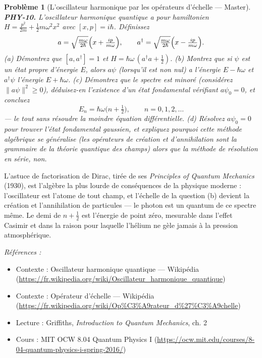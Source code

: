\documentclass[11pt]{article}
\newtheorem{problem}{Problème}
\newenvironment{refs}{\par\small\noindent\emph{Références :}\begin{itemize}\setlength\itemsep{0pt}}{\end{itemize}\normalsize}
\begin{document}
\begin{problem}[{L'oscillateur harmonique par les opérateurs d'échelle --- Master}]
\textbf{PHY-10.} L'oscillateur harmonique quantique a pour hamiltonien
$H = \frac{p^2}{2m} + \frac12 m\omega^2 x^2$ avec $[x, p] = i\hbar$. Définissez
\[ a = \sqrt{\tfrac{m\omega}{2\hbar}}\Bigl(x + \tfrac{ip}{m\omega}\Bigr), \qquad
a^\dagger = \sqrt{\tfrac{m\omega}{2\hbar}}\Bigl(x - \tfrac{ip}{m\omega}\Bigr). \]
(a) Démontrez que $[a, a^\dagger] = 1$ et $H = \hbar\omega\,(a^\dagger a + \tfrac12)$.
(b) Montrez que si $\psi$ est un état propre d'énergie $E$, alors $a\psi$ (lorsqu'il est non
nul) a l'énergie $E - \hbar\omega$ et $a^\dagger\psi$ l'énergie $E + \hbar\omega$.
(c) Démontrez que le spectre est minoré (considérez $\lVert a\psi \rVert^2 \ge 0$),
déduisez-en l'existence d'un état fondamental vérifiant $a\psi_0 = 0$, et concluez
\[ E_n = \hbar\omega\bigl(n + \tfrac12\bigr), \qquad n = 0, 1, 2, \dots \]
--- le tout sans résoudre la moindre équation différentielle. (d) Résolvez $a\psi_0 = 0$ pour
trouver l'état fondamental gaussien, et expliquez pourquoi cette méthode algébrique se généralise
(les opérateurs de création et d'annihilation sont la grammaire de la théorie quantique des
champs) alors que la méthode de résolution en série, non.
\end{problem}

\noindent L'astuce de factorisation de Dirac, tirée de ses \textit{Principles of Quantum
Mechanics} (1930), est l'algèbre la plus lourde de conséquences de la physique moderne :
l'oscillateur est l'atome de tout champ, et l'échelle de la question (b) devient la création et
l'annihilation de particules --- le photon est un quantum de ce spectre même. Le demi de
$n + \tfrac12$ est l'énergie de point zéro, mesurable dans l'effet Casimir et dans la raison
pour laquelle l'hélium ne gèle jamais à la pression atmosphérique.

\begin{refs}
\item Contexte : Oscillateur harmonique quantique --- Wikipédia (\url{https://fr.wikipedia.org/wiki/Oscillateur_harmonique_quantique})
\item Contexte : Opérateur d'échelle --- Wikipédia (\url{https://fr.wikipedia.org/wiki/Op%C3%A9rateur_d%27%C3%A9chelle})
\item Lecture : Griffiths, \textit{Introduction to Quantum Mechanics}, ch. 2
\item Cours : MIT OCW 8.04 Quantum Physics I (\url{https://ocw.mit.edu/courses/8-04-quantum-physics-i-spring-2016/})
\end{refs}
\end{document}
